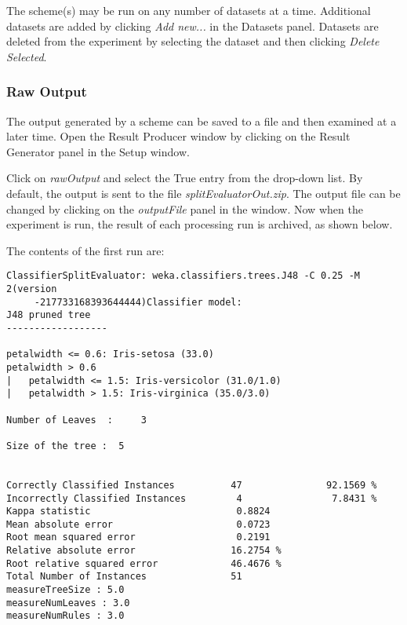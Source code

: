\documentclass[a4paper]{article}
\begin{document}
The scheme(s) may be run on any number of datasets at a time. Additional datasets are added by clicking \textit{Add new...} in the Datasets panel. Datasets are deleted from the experiment by selecting the dataset and then clicking \textit{Delete Selected}.


\subsubsection*{Raw Output}

The output generated by a scheme can be saved to a file and then examined at a later time. Open the Result Producer window by clicking on the Result Generator panel in the Setup window.
\begin{center}
\end{center}

Click on \textit{rawOutput} and select the True entry from the drop-down list. By default, the output is sent to the file \textit{splitEvaluatorOut.zip}. The output file can be changed by clicking on the \textit{outputFile} panel in the window. Now when the experiment is run, the result of each processing run is archived, as shown below.
\begin{center}
\end{center}

The contents of the first run are:

\begin{verbatim}
ClassifierSplitEvaluator: weka.classifiers.trees.J48 -C 0.25 -M 2(version 
     -217733168393644444)Classifier model: 
J48 pruned tree
------------------

petalwidth <= 0.6: Iris-setosa (33.0)
petalwidth > 0.6
|   petalwidth <= 1.5: Iris-versicolor (31.0/1.0)
|   petalwidth > 1.5: Iris-virginica (35.0/3.0) 

Number of Leaves  : 	3

Size of the tree : 	5 


Correctly Classified Instances          47               92.1569 %
Incorrectly Classified Instances         4                7.8431 %
Kappa statistic                          0.8824
Mean absolute error                      0.0723
Root mean squared error                  0.2191
Relative absolute error                 16.2754 %
Root relative squared error             46.4676 %
Total Number of Instances               51     
measureTreeSize : 5.0
measureNumLeaves : 3.0
measureNumRules : 3.0
\end{verbatim}
\end{document}
